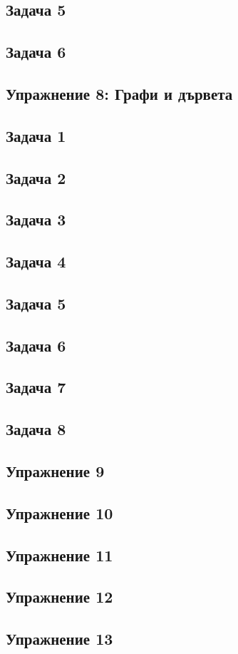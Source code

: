 \documentclass[fleqn, 12pt]{article}
\theoremstyle{definition}
\begin{document}
\subsection*{Задача 5}

\subsection*{Задача 6}

\newpage
\subsection{Упражнение 8: Графи и дървета}

\subsection*{Задача 1}

\subsection*{Задача 2}

\subsection*{Задача 3}

\subsection*{Задача 4}

\subsection*{Задача 5}

\subsection*{Задача 6}

\subsection*{Задача 7}

\subsection*{Задача 8}

\newpage
\subsection{Упражнение 9}

\newpage
\subsection{ Упражнение 10}

\newpage
\subsection{ Упражнение 11}

\newpage
\subsection{ Упражнение 12}

\newpage
\subsection{ Упражнение 13}
\end{document}
